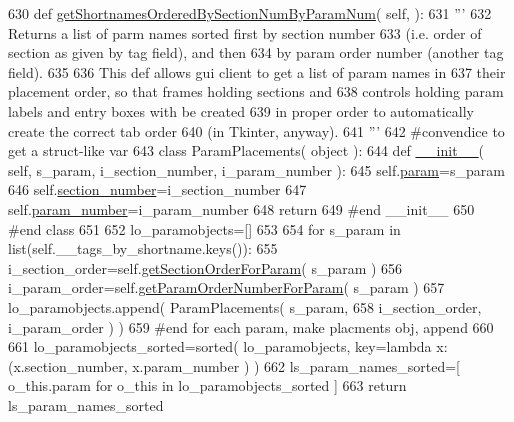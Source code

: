 \begin{DoxyCode}
630     \textcolor{keyword}{def }\hyperlink{classnegui_1_1pgparamset_1_1PGParamSet_a4f1aab0d1de87fbf66ea057e3577804c}{getShortnamesOrderedBySectionNumByParamNum}( self, ):
631         \textcolor{stringliteral}{'''}
632 \textcolor{stringliteral}{        Returns a list of parm names sorted first by section number}
633 \textcolor{stringliteral}{        (i.e. order of section as given by tag field), and then }
634 \textcolor{stringliteral}{        by param order number (another tag field). }
635 \textcolor{stringliteral}{}
636 \textcolor{stringliteral}{        This def allows gui client to get a list of param names in }
637 \textcolor{stringliteral}{        their placement order, so that frames holding sections and}
638 \textcolor{stringliteral}{        controls holding param labels and entry boxes with be created}
639 \textcolor{stringliteral}{        in proper order to automatically create the correct tab order}
640 \textcolor{stringliteral}{        (in Tkinter, anyway).}
641 \textcolor{stringliteral}{        '''}
642         \textcolor{comment}{#convendice to get a struct-like var}
643         \textcolor{keyword}{class }ParamPlacements( object ):
644             \textcolor{keyword}{def }\hyperlink{classnegui_1_1pgparamset_1_1PGParamSet_a598ea6a166f56fe5be01f86d4d8c91ba}{\_\_init\_\_}( self, s\_param, i\_section\_number, i\_param\_number ):
645                 self.\hyperlink{classnegui_1_1pgparamset_1_1PGParamSet_a51a7d3fde3da41e93f0c9f538ccd0edf}{param}=s\_param
646                 self.\hyperlink{classnegui_1_1pgparamset_1_1PGParamSet_a04420e446c9dd25d5d88fd62a734cb6e}{section\_number}=i\_section\_number
647                 self.\hyperlink{classnegui_1_1pgparamset_1_1PGParamSet_ab9fca9825029bbe54878b4b6f32c75c7}{param\_number}=i\_param\_number
648                 \textcolor{keywordflow}{return}
649             \textcolor{comment}{#end \_\_init\_\_}
650         \textcolor{comment}{#end class}
651 
652         lo\_paramobjects=[]
653 
654         \textcolor{keywordflow}{for} s\_param \textcolor{keywordflow}{in} list(self.\_\_tags\_by\_shortname.keys()):
655             i\_section\_order=self.\hyperlink{classnegui_1_1pgparamset_1_1PGParamSet_a18000b825994a6784da5ead88e300e98}{getSectionOrderForParam}( s\_param )
656             i\_param\_order=self.\hyperlink{classnegui_1_1pgparamset_1_1PGParamSet_a5eccd6863398ff156943e9f3dd3c2b4c}{getParamOrderNumberForParam}( s\_param )
657             lo\_paramobjects.append( ParamPlacements( s\_param, 
658                                     i\_section\_order, i\_param\_order ) )
659         \textcolor{comment}{#end for each param, make placments obj, append}
660 
661         lo\_paramobjects\_sorted=sorted( lo\_paramobjects, key=\textcolor{keyword}{lambda} x: (x.section\_number, x.param\_number ) )
662         ls\_param\_names\_sorted=[ o\_this.param \textcolor{keywordflow}{for} o\_this \textcolor{keywordflow}{in} lo\_paramobjects\_sorted ]
663         \textcolor{keywordflow}{return} ls\_param\_names\_sorted
\end{DoxyCode}

